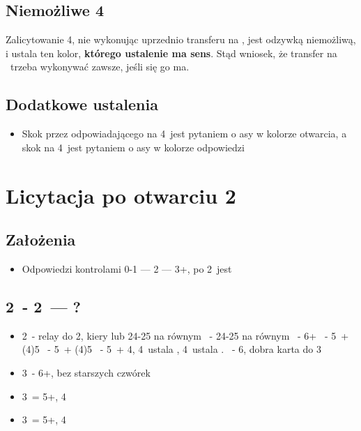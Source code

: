 \documentclass[12pt, a4paper]{article}
\begin{document}
\subsection{Niemożliwe 4\diams}
Zalicytowanie 4\diams, nie wykonując uprzednio transferu na \diams, jest odzywką niemożliwą, i ustala
ten kolor, \textbf{którego ustalenie ma sens}. Stąd wniosek, że transfer na \diams\ trzeba wykonywać zawsze, 
jeśli się go ma.

\subsection{Dodatkowe ustalenia}
\begin{itemize}
    \item Skok przez odpowiadającego na 4\clubs\ jest pytaniem o asy w kolorze otwarcia,
    a skok na 4\diams\ jest pytaniem o asy w kolorze odpowiedzi
\end{itemize}

\pagebreak
\section{Licytacja po otwarciu 2\clubs}
\subsection{Założenia}
\begin{itemize}
    \item Odpowiedzi kontrolami 0-1 --- 2 --- 3+, po 2\major\ jest \gf
\end{itemize}

\subsection{2\clubs\ - 2\diams\ --- ?}
\begin{itemize}
    \item 2\hearts\ - relay do 2\spades, kiery lub 24-25 na równym
    \nt\ - 24-25 na równym
    \clubs\ - 6+\hearts
    \diams\ - 5\hearts\ + (4)5\diams
    \hearts\ - 5\hearts\ + (4)5\clubs
    \spades\ - 5\hearts\ + 4\spades, 4\clubs\ ustala \hearts, 4\diams\ ustala \spades.
    \nt\ - 6, dobra karta do 3\nt
    \item 3\diams\ - 6+\diams, bez starszych czwórek
    \item 3\hearts\ = 5+\diams, 4\hearts
    \item 3\spades\ = 5+\diams, 4\spades
\end{itemize}
\end{document}
